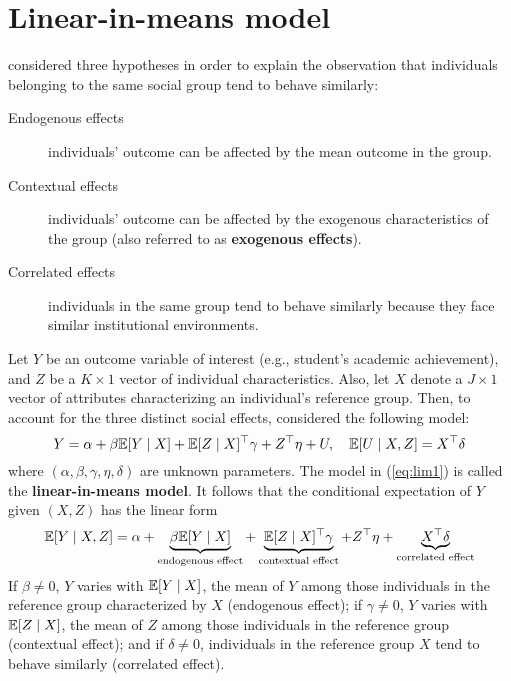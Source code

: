 \documentclass[11pt, A4paper, openany, uplatex]{book}
\begin{document}
\section{Linear-in-means model}
\cite{manski1993identification} considered three hypotheses in order to explain the observation that individuals belonging to the same social group tend to behave similarly:
\begin{description}
	\item[Endogenous effects]  individuals' outcome can be affected by the mean outcome in the group.
	\item[Contextual effects] individuals' outcome can be affected by the exogenous characteristics of the group (also referred to as \textbf{exogenous effects}).
	\item[Correlated effects] individuals in the same group tend to behave similarly because they face similar institutional environments.
\end{description}

Let $Y$ be an outcome variable of interest (e.g., student's academic achievement), and $Z$ be a $K \times 1$ vector of individual characteristics. Also, let $X$ denote a $J \times 1$ vector of attributes characterizing an individual's reference group. Then, to account for the three distinct social effects, \cite{manski1993identification} considered the following model:
\begin{equation}\label{eq:lim1}
	Y = \alpha + \beta \mathbb{E}[Y \mid X] + \mathbb{E}[Z \mid X]^\top \gamma + Z^\top \eta + U, \quad \mathbb{E}[U \mid X, Z] = X^\top \delta 
\end{equation}
where $(\alpha, \beta, \gamma, \eta, \delta)$ are unknown parameters. The model in (\ref{eq:lim1}) is called the \textbf{linear-in-means model}. It follows that the conditional expectation of $Y$ given $(X, Z)$ has the linear form
\begin{equation}\label{eq:lim2}
	\mathbb{E}[ Y \mid X, Z] = \alpha + \underbrace{\beta \mathbb{E}[Y \mid X]}_{\text{endogenous effect}} + \underbrace{\mathbb{E}[Z \mid X]^\top \gamma}_{\text{contextual effect}} + Z^\top \eta + \underbrace{X^\top \delta}_{\text{correlated effect}}
\end{equation}
If $\beta \neq 0$, $Y$ varies with $\mathbb{E}[Y \mid X]$, the mean of $Y$ among those individuals in the reference group characterized by $X$ (endogenous effect); if $\gamma \neq 0$, $Y$ varies with $\mathbb{E}[Z \mid X]$, the mean of $Z$ among those individuals in the reference group (contextual effect); and if $\delta \neq 0$, individuals in the reference group $X$ tend to behave similarly (correlated effect).
\end{document}
